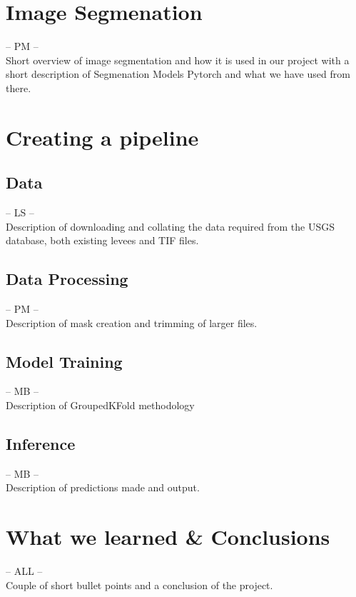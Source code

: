 \documentclass[NOTE, disdraft=true, UKenglish]{\DISCDTLATEXPATH UCLCDTDISdoc}
\begin{document}
\section{Image Segmenation}
\label{sec:method}
%
-- PM --\\
Short overview of image segmentation and how it is used in our project with a short description of Segmenation Models Pytorch and what we have used from there.
\section{Creating a pipeline}
\label{sec:results}
%
\subsection{Data}
-- LS --\\
Description of downloading and collating the data required from the USGS database, both existing levees and TIF files.
\subsection{Data Processing}
-- PM --\\
Description of mask creation and trimming of larger files.
\subsection{Model Training}
-- MB --\\
Description of GroupedKFold methodology
\subsection{Inference}
-- MB --\\
Description of predictions made and output.
\section{What we learned \& Conclusions}
\label{sec:conclusion}
%
-- ALL --\\
Couple of short bullet points and a conclusion of the project.
\end{document}
